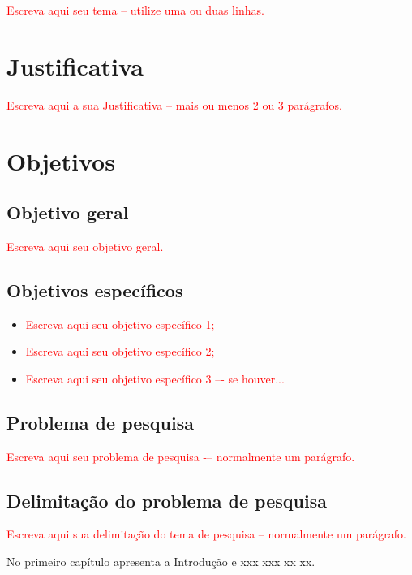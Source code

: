 \documentclass[]{senac-tcc}
\begin{document}
\textcolor{red}{Escreva aqui seu tema -- utilize uma ou duas linhas.}

\section{Justificativa}

\textcolor{red}{Escreva aqui a sua Justificativa -- mais ou menos 2 ou 3 parágrafos.} \lipsum[3-5]

\section{Objetivos}

\subsection{Objetivo geral}

\textcolor{red}{Escreva aqui seu objetivo geral.}

\subsection{Objetivos específicos}

\begin{itemize}
    \item \textcolor{red}{Escreva aqui seu objetivo específico 1;}
    \item \textcolor{red}{Escreva aqui seu objetivo específico 2;}
    \item \textcolor{red}{Escreva aqui seu objetivo específico 3 –- se houver...}
\end{itemize}


\subsection{Problema de pesquisa}

\textcolor{red}{Escreva aqui seu problema de pesquisa -– normalmente um parágrafo.} \lipsum[6]

\subsection{Delimitação do problema de pesquisa}

\textcolor{red}{Escreva aqui sua delimitação do tema de pesquisa – normalmente um parágrafo.} \lipsum[7]

No primeiro capítulo apresenta a Introdução e xxx xxx xx xx.
 	
\end{document}
